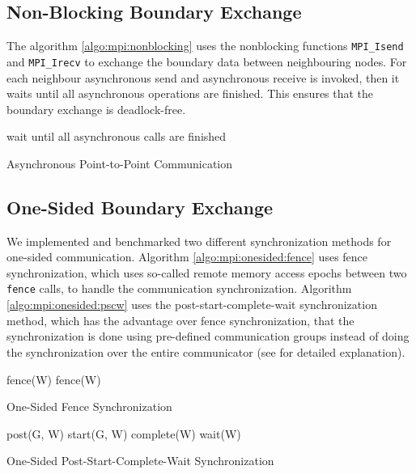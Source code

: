 \documentclass[11pt,a4paper]{article}
\begin{document}
\subsection{Non-Blocking Boundary Exchange}
The algorithm \ref{algo:mpi:nonblocking} uses the nonblocking functions \verb|MPI_Isend| and \verb|MPI_Irecv| to exchange the boundary data between neighbouring nodes. For each neighbour asynchronous send and asynchronous receive is invoked, then it waits until all asynchronous operations are finished. This ensures that the boundary exchange is deadlock-free.\\

\begin{algorithm}[H] \label{algo:mpi:nonblocking}
 wait until all asynchronous calls are finished\;
 \caption{Asynchronous Point-to-Point Communication}
\end{algorithm}

\subsection{One-Sided Boundary Exchange} \label{subsec:mpi:onsided}
We implemented and benchmarked two different synchronization methods for one-sided communication. Algorithm \ref{algo:mpi:onesided:fence} uses fence synchronization, which uses so-called remote memory access epochs between two \verb|fence| calls, to handle the communication synchronization. Algorithm \ref{algo:mpi:onesided:pscw} uses the post-start-complete-wait synchronization method, which has the advantage over fence synchronization, that the synchronization is done using pre-defined communication groups instead of doing the synchronization over the entire communicator (see \cite{SteveLantz2013} for detailed explanation).\\

\begin{algorithm}[H] \label{algo:mpi:onesided:fence}
 fence(W)\;
 fence(W)\;
 \caption{One-Sided Fence Synchronization}
\end{algorithm}

\begin{algorithm}[H] \label{algo:mpi:onesided:pscw}
 post(G, W)\;
 start(G, W)\;
 complete(W)\;
 wait(W)\;
 \caption{One-Sided Post-Start-Complete-Wait Synchronization}
\end{algorithm}
\end{document}
